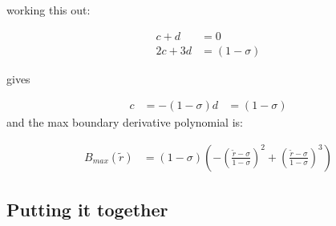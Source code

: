 \documentclass[a4paper]{article}
\begin{document}
working this out: 

\begin{align*}
    c + d &=  0 \\
    2c + 3d &= (1 - \sigma)
\end{align*} 

gives 

\begin{align*}
    c &= -\left( 1 - \sigma\right)
    d &= \left( 1 - \sigma\right)
\end{align*}
and the max boundary derivative polynomial is:

\begin{align*}
    B_{max} \left( \widetilde{r} \right) &= 
    \left( 1 - \sigma \right) \left( 
        - \left( \frac{\widetilde{r}-\sigma}{1 - \sigma} \right)^2 +
        \left( \frac{\widetilde{r}-\sigma}{1-\sigma} \right)^3
    \right)
\end{align*}
\subsection{Putting it together}
\end{document}
